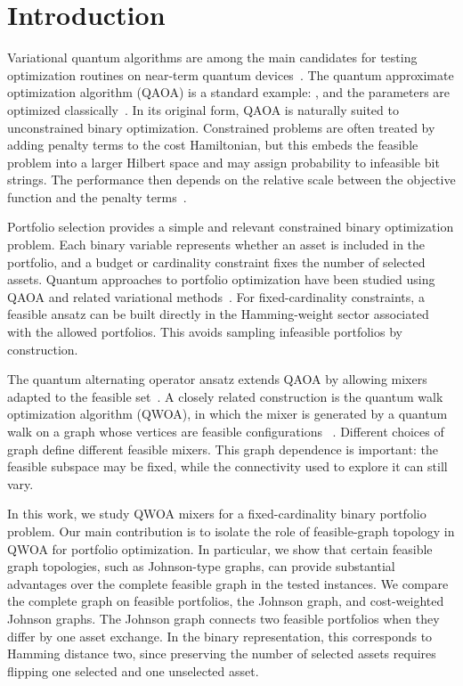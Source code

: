 
\section{\label{sec:intro}Introduction}

Variational quantum algorithms are among the main candidates for testing
optimization routines on near-term quantum devices~\cite{Cerezo2021,Moll2018}.
The quantum approximate optimization algorithm (QAOA) is a standard example: , 
and the parameters are optimized classically~\cite{Farhi2014,Blekos2024}.
In its original form, QAOA is naturally suited to unconstrained binary
optimization. Constrained problems are often treated by adding penalty terms to
the cost Hamiltonian, but this embeds the feasible problem into a larger
Hilbert space and may assign probability to infeasible bit strings. The
performance then depends on the relative scale between the objective function
and the penalty terms~\cite{Hadfield2019,Blekos2024}.

Portfolio selection provides a simple and relevant constrained binary
optimization problem. Each binary variable represents whether an asset is
included in the portfolio, and a budget or cardinality constraint fixes the
number of selected assets. Quantum approaches to portfolio optimization have
been studied using QAOA and related variational methods~\cite{Hodson2019,Slate2021, Scursulim2026}.
For fixed-cardinality constraints, a feasible ansatz can be built directly in
the Hamming-weight sector associated with the allowed portfolios. This avoids
sampling infeasible portfolios by construction.

The quantum alternating operator ansatz extends QAOA by allowing mixers adapted
to the feasible set~\cite{Hadfield2019}. A closely related construction is the
quantum walk optimization algorithm (QWOA), in which the mixer is generated by
a quantum walk on a graph whose vertices are feasible configurations 
~\cite{Marsh2019, Slate2021quantumwalkbased}. Different choices of graph define different
feasible mixers. This graph dependence is important: the feasible subspace may
be fixed, while the connectivity used to explore it can still vary.

In this work, we study QWOA mixers for a fixed-cardinality binary portfolio
problem. Our main contribution is to isolate the role of feasible-graph
topology in QWOA for portfolio optimization. In particular, we show that
certain feasible graph topologies, such as Johnson-type graphs, can provide
substantial advantages over the complete feasible graph in the tested
instances. We compare the complete graph on feasible portfolios, the Johnson
graph, and cost-weighted Johnson graphs. The Johnson graph connects two
feasible portfolios when they differ by one asset exchange. In the binary
representation, this corresponds to Hamming distance two, since preserving the
number of selected assets requires flipping one selected and one unselected
asset.

